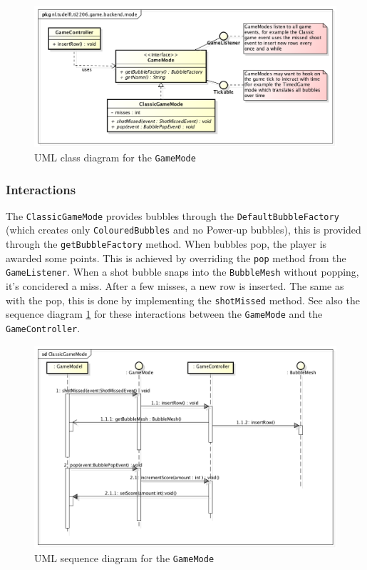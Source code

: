 \documentclass[a4paper]{article}
\begin{document}
\begin{figure}[H]
	\centering
	\includegraphics[scale=0.5]{GameMode.png}
    \caption{UML class diagram for the \texttt{GameMode}}
\end{figure}

\subsubsection*{Interactions}
The \texttt{ClassicGameMode} provides bubbles through the \texttt{DefaultBubbleFactory} (which creates only \texttt{ColouredBubbles} and no Power-up bubbles), this is provided through the \texttt{getBubbleFactory} method. When bubbles pop, the player is awarded some points. This is achieved by overriding the \texttt{pop} method from the \texttt{GameListener}. When a shot bubble snaps into the \texttt{BubbleMesh} without popping, it's concidered a miss. After a few misses, a new row is inserted. The same as with the pop, this is done by implementing the \texttt{shotMissed} method. See also the sequence diagram \ref{fig:seqgamemode} for these interactions between the \texttt{GameMode} and the \texttt{GameController}.

\begin{figure}[H]
	\centering
	\includegraphics[scale=0.5]{ClassicGameMode.png}
    \caption{UML sequence diagram for the \texttt{GameMode}}
    \label{fig:seqgamemode}
\end{figure}
\end{document}
